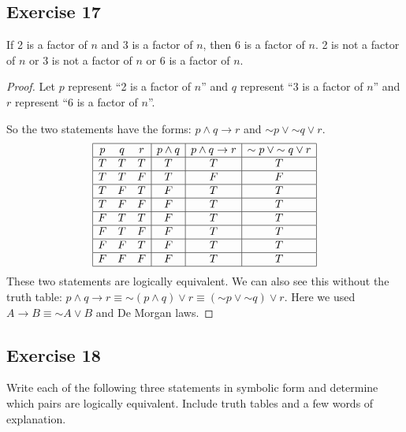 \documentclass[14pt]{extarticle}
\begin{document}
\subsection{Exercise 17}
If 2 is a factor of $n$ and 3 is a factor of $n$, then 6 is a factor of $n$. 2 is not a factor of $n$ or 3 is not a factor of $n$ or 6 is a factor of $n$.

\begin{proof}
    Let $p$ represent “2 is a factor of $n$” and $q$ represent “3 is a factor of $n$” and $r$ represent ``6 is a factor of $n$''.

    So the two statements have the forms: $p \wedge q \to r$ and ${\sim p} \vee {\sim q} \vee r$.
    $$
        \begin{array}{|ccc|c|c|c|}
            \hline
            p & q & r & p \wedge q & p \wedge q \to r & {\sim p} \vee {\sim q} \vee r \\
            \hline
            T & T & T & T          & T                & T                             \\
            \hline
            T & T & F & T          & F                & F                             \\
            \hline
            T & F & T & F          & T                & T                             \\
            \hline
            T & F & F & F          & T                & T                             \\
            \hline
            F & T & T & F          & T                & T                             \\
            \hline
            F & T & F & F          & T                & T                             \\
            \hline
            F & F & T & F          & T                & T                             \\
            \hline
            F & F & F & F          & T                & T                             \\
            \hline
        \end{array}
    $$
    These two statements are logically equivalent. We can also see this without the truth table: $p \wedge q \to r \equiv {\sim (p \wedge q)} \vee r \equiv ({\sim p} \vee {\sim q}) \vee r$. Here we used $A \to B \equiv {\sim A} \vee B$ and De Morgan laws. \end{proof}

\subsection{Exercise 18}
Write each of the following three statements in symbolic form and determine which pairs are logically equivalent. Include truth tables and a few words of explanation.
\end{document}
